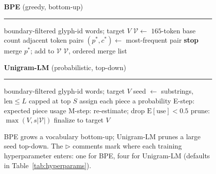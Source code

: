 \documentclass{article}
\begin{document}
\begin{figure}[htbp]
  \centering
  \begin{minipage}[t]{0.485\textwidth}
    \centering
    \textbf{BPE} {\footnotesize(greedy, bottom-up)}\\[2pt]
    \rule{\linewidth}{0.8pt}
    \raggedright\footnotesize
    \begin{algorithmic}[1]
      \Require boundary-filtered glyph-id words; target $V$
      \State $\mathcal{V} \gets$ $165$-token base
        \State count adjacent token pairs
        \State $(p^{*}, c^{*}) \gets$ most-frequent pair
         \textbf{stop} 
        \EndIf
        \State merge $p^{*}$; add to $\mathcal{V}$
      \EndWhile
      \State \Return $\mathcal{V}$, ordered merge list
    \end{algorithmic}
  \end{minipage}\hfill
  \begin{minipage}[t]{0.485\textwidth}
    \centering
    \textbf{Unigram-LM} {\footnotesize(probabilistic, top-down)}\\[2pt]
    \rule{\linewidth}{0.8pt}
    \raggedright\footnotesize
    \begin{algorithmic}[1]
      \Require boundary-filtered glyph-id words; target $V$
      \State seed $\gets$ substrings, $\text{len}\le L$
      \State \quad capped at top $S$
      \State assign each piece a probability
         
          \State E-step: expected piece usage
          \State M-step: re-estimate; drop $\mathrm{E}[\text{use}]<0.5$
        \EndFor
        \State prune: $\max(V, s|\mathcal{V}|)$
      \EndWhile
      \State finalize to target $V$
    \end{algorithmic}
  \end{minipage}
  \caption{BPE grows a vocabulary bottom-up; Unigram-LM prunes a large seed
  top-down. The $\triangleright$ comments mark where each training hyperparameter
  enters: one for BPE, four for Unigram-LM (defaults in
  Table~\ref{tab:hyperparams}).}
  \label{fig:algos}
\end{figure}


\end{document}
